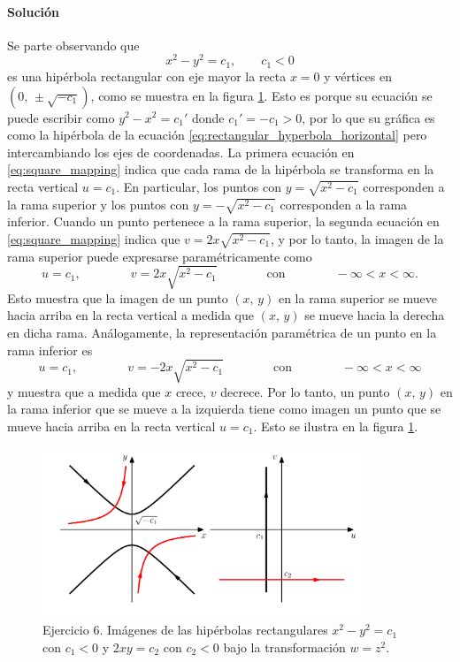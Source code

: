 \documentclass[a4paper]{report}
\begin{document}
\paragraph{Solución} Se parte observando que
\[
 x^2-y^2=c_1,\qquad c_1<0
\]
es una hipérbola rectangular con eje mayor la recta \(x=0\) y vértices en \((0,\,\pm\sqrt{-c_1})\), como se muestra en la figura \ref{fig:exercise_14_06}. Esto es porque su ecuación se puede escribir como \(y^2-x^2=c_1'\) donde \(c_1'=-c_1>0\), por lo que su gráfica es como la hipérbola de la ecuación \ref{eq:rectangular_hyperbola_horizontal} pero intercambiando los ejes de coordenadas. La primera ecuación en \ref{eq:square_mapping} indica que cada rama de la hipérbola se transforma en la recta vertical \(u=c_1\). En particular, los puntos con \(y=\sqrt{x^2-c_1}\) corresponden a la rama superior y los puntos con \(y=-\sqrt{x^2-c_1}\) corresponden a la rama inferior. Cuando un punto pertenece a la rama superior, la segunda ecuación en \ref{eq:square_mapping} indica que \(v=2x\sqrt{x^2-c_1}\), y por lo tanto, la imagen de la rama superior puede expresarse paramétricamente como
\[
 u=c_1,\qquad\qquad v=2x\sqrt{x^2-c_1}\qquad\qquad\textrm{con}\qquad\qquad-\infty<x<\infty.
\]
Esto muestra que la imagen de un punto \((x,\,y)\) en la rama superior se mueve hacia arriba en la recta vertical a medida que \((x,\,y)\) se mueve hacia la derecha en dicha rama. Análogamente, la representación paramétrica de un punto en la rama inferior es
\[
 u=c_1,\qquad\qquad v=-2x\sqrt{x^2-c_1}\qquad\qquad\textrm{con}\qquad\qquad-\infty<x<\infty
\]
y muestra que a medida que \(x\) crece, \(v\) decrece. Por lo tanto, un punto \((x,\,y)\) en la rama inferior que se mueve a la izquierda tiene como imagen un punto que se mueve hacia arriba en la recta vertical \(u=c_1\). Esto se ilustra en la figura \ref{fig:exercise_14_06}.
\begin{figure}[!htb]
 \begin{center}
 \includegraphics[width=0.85\textwidth]{figuras/exercise_14_06.pdf}
 \caption{\label{fig:exercise_14_06} Ejercicio 6. Imágenes de las hipérbolas rectangulares \(x^2-y^2=c_1\) con \(c_1<0\) y \(2xy=c_2\) con \(c_2<0\) bajo la transformación \(w=z^2\).}
 \end{center}
\end{figure}
\end{document}
